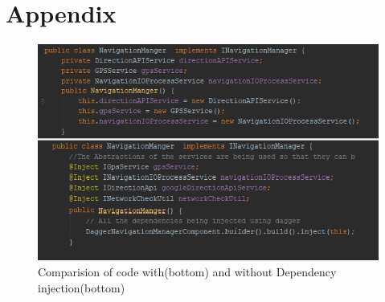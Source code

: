 \chapter{Appendix}
    \begin{figure}[htbp!]
        \centering \includegraphics{grafiken/di_compare.png}
        \caption{Comparision of code with(bottom) and without Dependency injection(bottom)}
        \label{fig:DIComparision}
    \end{figure}